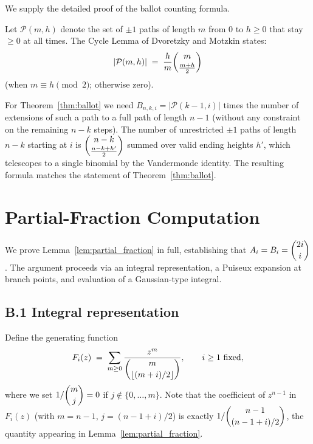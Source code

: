 \documentclass[12pt,a4paper]{article}
\theoremstyle{definition}
\renewcommand{\binom}[2]{\dbinom{#1}{#2}}
\newcommand{\abs}[1]{\lvert #1 \rvert}
\begin{document}
We supply the detailed proof of the ballot counting formula.

Let $\mathcal{P}(m,h)$ denote the set of $\pm 1$ paths of length $m$
from $0$ to $h\ge 0$ that stay $\ge 0$ at all times.  The Cycle Lemma
of Dvoretzky and Motzkin \cite{DvoretzkyMotzkin1947} states:
\[
\abs{\mathcal{P}(m,h)} \;=\; \frac{h}{m}\binom{m}{\frac{m+h}{2}}
\]
(when $m\equiv h\pmod{2}$; otherwise zero).

For Theorem~\ref{thm:ballot} we need $B_{n,k,i} = \abs{\mathcal{P}(k-1,i)}$
times the number of extensions of such a path to a full path of length
$n-1$ (without any constraint on the remaining $n-k$ steps).  The
number of unrestricted $\pm 1$ paths of length $n-k$ starting at $i$
is $\binom{n-k}{\frac{n-k+h'}{2}}$ summed over valid ending heights
$h'$, which telescopes to a single binomial by the Vandermonde identity.
The resulting formula matches the statement of Theorem~\ref{thm:ballot}.

\section{Partial-Fraction Computation}
\label{app:pf}

We prove Lemma~\ref{lem:partial_fraction} in full, establishing that
$A_i = B_i = \binom{2i}{i}$.  The argument proceeds via an integral
representation, a Puiseux expansion at branch points, and evaluation
of a Gaussian-type integral.

\subsection*{B.1 Integral representation}

Define the generating function
\[
F_i(z) \;=\; \sum_{m\ge 0} \frac{z^m}{\binom{m}{\lfloor(m+i)/2\rfloor}},
\qquad i\ge 1 \text{ fixed},
\]
where we set $1/\binom{m}{j}=0$ if $j\notin\{0,\dots,m\}$.
Note that the coefficient of $z^{n-1}$ in $F_i(z)$ (with $m=n-1$,
$j=(n-1+i)/2$) is exactly $1/\binom{n-1}{(n-1+i)/2}$, the quantity
appearing in Lemma~\ref{lem:partial_fraction}.
\end{document}
